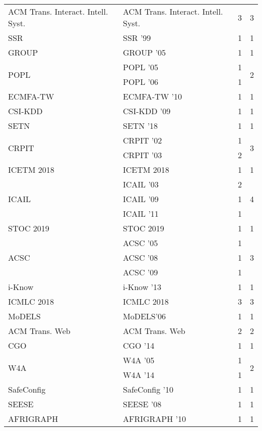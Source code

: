 \begin{table*}[t]
\begin{tabular}{llrr}
\multirow{1}{*}{ACM Trans. Interact. Intell. Syst.} & ACM Trans. Interact. Intell. Syst. & 3 & \multirow{1}{*}{3}\\
\multirow{1}{*}{SSR } & SSR '99 & 1 & \multirow{1}{*}{1}\\
\multirow{1}{*}{GROUP } & GROUP '05 & 1 & \multirow{1}{*}{1}\\
\multirow{2}{*}{POPL } & POPL '05 & 1 & \multirow{2}{*}{2}\\
& POPL '06 & 1 &\\
\multirow{1}{*}{ECMFA-TW } & ECMFA-TW '10 & 1 & \multirow{1}{*}{1}\\
\multirow{1}{*}{CSI-KDD } & CSI-KDD '09 & 1 & \multirow{1}{*}{1}\\
\multirow{1}{*}{SETN } & SETN '18 & 1 & \multirow{1}{*}{1}\\
\multirow{2}{*}{CRPIT } & CRPIT '02 & 1 & \multirow{2}{*}{3}\\
& CRPIT '03 & 2 &\\
\multirow{1}{*}{ICETM 2018} & ICETM 2018 & 1 & \multirow{1}{*}{1}\\
\multirow{3}{*}{ICAIL } & ICAIL '03 & 2 & \multirow{3}{*}{4}\\
& ICAIL '09 & 1 &\\
& ICAIL '11 & 1 &\\
\multirow{1}{*}{STOC 2019} & STOC 2019 & 1 & \multirow{1}{*}{1}\\
\multirow{3}{*}{ACSC } & ACSC '05 & 1 & \multirow{3}{*}{3}\\
& ACSC '08 & 1 &\\
& ACSC '09 & 1 &\\
\multirow{1}{*}{i-Know } & i-Know '13 & 1 & \multirow{1}{*}{1}\\
\multirow{1}{*}{ICMLC 2018} & ICMLC 2018 & 3 & \multirow{1}{*}{3}\\
\multirow{1}{*}{MoDELS} & MoDELS'06 & 1 & \multirow{1}{*}{1}\\
\multirow{1}{*}{ACM Trans. Web} & ACM Trans. Web & 2 & \multirow{1}{*}{2}\\
\multirow{1}{*}{CGO } & CGO '14 & 1 & \multirow{1}{*}{1}\\
\multirow{2}{*}{W4A } & W4A '05 & 1 & \multirow{2}{*}{2}\\
& W4A '14 & 1 &\\
\multirow{1}{*}{SafeConfig } & SafeConfig '10 & 1 & \multirow{1}{*}{1}\\
\multirow{1}{*}{SEESE } & SEESE '08 & 1 & \multirow{1}{*}{1}\\
\multirow{1}{*}{AFRIGRAPH } & AFRIGRAPH '10 & 1 & \multirow{1}{*}{1}\\

\end{tabular}
\end{table*}
